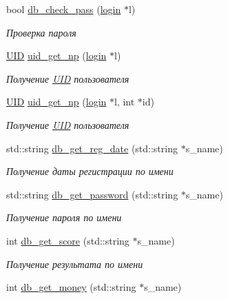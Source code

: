 \begin{DoxyCompactItemize}
bool \mbox{\hyperlink{class_d_b_a0608c5cb7f815d143a54bda2e318de84}{db\+\_\+check\+\_\+pass}} (\mbox{\hyperlink{structlogin}{login}} $\ast$l)
\begin{DoxyCompactList}\small\item\em Проверка пароля \end{DoxyCompactList}\item 
\mbox{\hyperlink{struct_u_i_d}{U\+ID}} \mbox{\hyperlink{group__dbcpp_ga5acc70d365de65365c861533a2b755c3}{uid\+\_\+get\+\_\+np}} (\mbox{\hyperlink{structlogin}{login}} $\ast$l)
\begin{DoxyCompactList}\small\item\em Получение \mbox{\hyperlink{struct_u_i_d}{U\+ID}} пользователя \end{DoxyCompactList}\item 
\mbox{\hyperlink{struct_u_i_d}{U\+ID}} \mbox{\hyperlink{group__dbcpp_ga9c55abcaab4db2b421bf72c968a818a4}{uid\+\_\+get\+\_\+np}} (\mbox{\hyperlink{structlogin}{login}} $\ast$l, int $\ast$id)
\begin{DoxyCompactList}\small\item\em Получение \mbox{\hyperlink{struct_u_i_d}{U\+ID}} пользователя \end{DoxyCompactList}\item 
std\+::string \mbox{\hyperlink{group__dbcpp_gad7c6310d2669acd40978fd4662f90d53}{db\+\_\+get\+\_\+reg\+\_\+date}} (std\+::string $\ast$s\+\_\+name)
\begin{DoxyCompactList}\small\item\em Получение даты регистрации по имени \end{DoxyCompactList}\item 
std\+::string \mbox{\hyperlink{group__dbcpp_ga35efc0a2ff41b4ef47c88c87f20feee4}{db\+\_\+get\+\_\+password}} (std\+::string $\ast$s\+\_\+name)
\begin{DoxyCompactList}\small\item\em Получение пароля по имени \end{DoxyCompactList}\item 
int \mbox{\hyperlink{group__dbcpp_ga990cefb97ea7222649511f37334a8601}{db\+\_\+get\+\_\+score}} (std\+::string $\ast$s\+\_\+name)
\begin{DoxyCompactList}\small\item\em Получение результата по имени \end{DoxyCompactList}\item 
int \mbox{\hyperlink{group__dbcpp_ga004b212ee48936251ff24b9f70d67dd0}{db\+\_\+get\+\_\+money}} (std\+::string $\ast$s\+\_\+name)

\end{DoxyCompactItemize}

